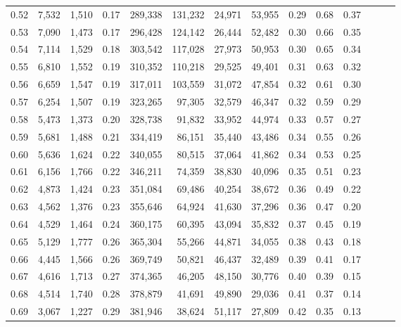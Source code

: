 \begin{tabular}{rrrrrrrrrrrrrr}
0.52 &   7,532 &  1,510 &  0.17 &  289,338 &  131,232 &  24,971 &  53,955 &  0.29 &  0.68 &      0.37 \\
0.53 &   7,090 &  1,473 &  0.17 &  296,428 &  124,142 &  26,444 &  52,482 &  0.30 &  0.66 &      0.35 \\
0.54 &   7,114 &  1,529 &  0.18 &  303,542 &  117,028 &  27,973 &  50,953 &  0.30 &  0.65 &      0.34 \\
0.55 &   6,810 &  1,552 &  0.19 &  310,352 &  110,218 &  29,525 &  49,401 &  0.31 &  0.63 &      0.32 \\
0.56 &   6,659 &  1,547 &  0.19 &  317,011 &  103,559 &  31,072 &  47,854 &  0.32 &  0.61 &      0.30 \\
0.57 &   6,254 &  1,507 &  0.19 &  323,265 &   97,305 &  32,579 &  46,347 &  0.32 &  0.59 &      0.29 \\
0.58 &   5,473 &  1,373 &  0.20 &  328,738 &   91,832 &  33,952 &  44,974 &  0.33 &  0.57 &      0.27 \\
0.59 &   5,681 &  1,488 &  0.21 &  334,419 &   86,151 &  35,440 &  43,486 &  0.34 &  0.55 &      0.26 \\
0.60 &   5,636 &  1,624 &  0.22 &  340,055 &   80,515 &  37,064 &  41,862 &  0.34 &  0.53 &      0.25 \\
0.61 &   6,156 &  1,766 &  0.22 &  346,211 &   74,359 &  38,830 &  40,096 &  0.35 &  0.51 &      0.23 \\
0.62 &   4,873 &  1,424 &  0.23 &  351,084 &   69,486 &  40,254 &  38,672 &  0.36 &  0.49 &      0.22 \\
0.63 &   4,562 &  1,376 &  0.23 &  355,646 &   64,924 &  41,630 &  37,296 &  0.36 &  0.47 &      0.20 \\
0.64 &   4,529 &  1,464 &  0.24 &  360,175 &   60,395 &  43,094 &  35,832 &  0.37 &  0.45 &      0.19 \\
0.65 &   5,129 &  1,777 &  0.26 &  365,304 &   55,266 &  44,871 &  34,055 &  0.38 &  0.43 &      0.18 \\
0.66 &   4,445 &  1,566 &  0.26 &  369,749 &   50,821 &  46,437 &  32,489 &  0.39 &  0.41 &      0.17 \\
0.67 &   4,616 &  1,713 &  0.27 &  374,365 &   46,205 &  48,150 &  30,776 &  0.40 &  0.39 &      0.15 \\
0.68 &   4,514 &  1,740 &  0.28 &  378,879 &   41,691 &  49,890 &  29,036 &  0.41 &  0.37 &      0.14 \\
0.69 &   3,067 &  1,227 &  0.29 &  381,946 &   38,624 &  51,117 &  27,809 &  0.42 &  0.35 &      0.13 \\

\end{tabular}
